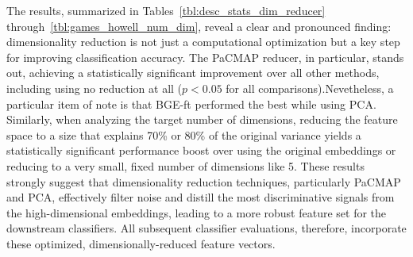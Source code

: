 The results, summarized in Tables~\ref{tbl:desc_stats_dim_reducer} through~\ref{tbl:games_howell_num_dim}, reveal a clear and pronounced finding: dimensionality reduction is not just a computational optimization but a key step for improving classification accuracy. The PaCMAP reducer, in particular, stands out, achieving a statistically significant improvement over all other methods, including using no reduction at all (\(p<0.05\) for all comparisons).Nevetheless, a particular item of note is that BGE-ft performed the best while using PCA.  Similarly, when analyzing the target number of dimensions, reducing the feature space to a size that explains 70\% or 80\% of the original variance yields a statistically significant performance boost over using the original embeddings or reducing to a very small, fixed number of dimensions like 5. These results strongly suggest that dimensionality reduction techniques, particularly PaCMAP and PCA, effectively filter noise and distill the most discriminative signals from the high-dimensional embeddings, leading to a more robust feature set for the downstream classifiers. All subsequent classifier evaluations, therefore, incorporate these optimized, dimensionally-reduced feature vectors.

\begin{table}[!htbp]
    \captionsetup{skip=5pt}
\centering
\caption{Descriptive Statistics for F1-Scores by Dimensionality Reducer (Test Data)}
\label{tbl:desc_stats_dim_reducer}
\end{table}

